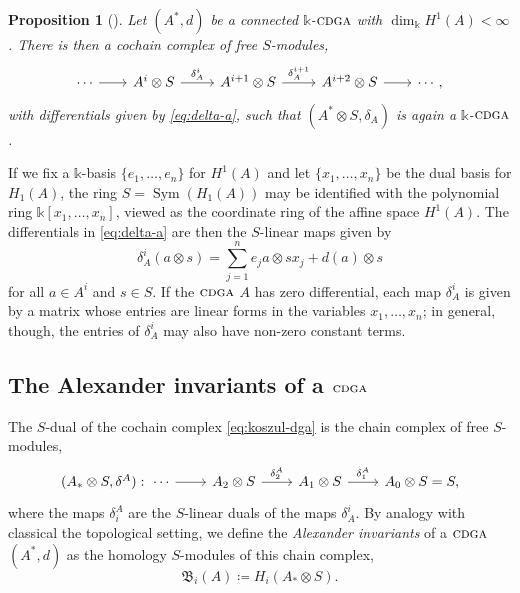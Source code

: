 \documentclass{article}
\numberwithin{equation}{section}
\newtheorem{proposition}[theorem]{Proposition}
\theoremstyle{definition}
\renewcommand{\k}{\mathbb{k}}
\newcommand{\B}{\mathfrak{B}}
\newcommand{\cdga}{\ensuremath{\textsc{cdga}}}
\DeclareMathOperator{\Sym}{Sym}
\begin{document}
\begin{proposition}[\cite{Su-cdga}]
\label{prop:LA}
Let $(A^*,d)$ be a connected $\k$-$\cdga$ with 
$\dim_\k H^1(A)<\infty$. There is then 
a cochain complex of free $S$-modules,
\begin{equation}
\label{eq:koszul-dga}
\begin{tikzcd}[column sep =20pt]
 \cdots \ar[r] 
& A^{i}\otimes S \ar[r, "\delta^{i}_A"] 
&[4pt] A^{i+1} \otimes S \ar[r, "\delta^{i+1}_A"] 
&[4pt] A^{i+2} \otimes S \ar[r] 
& \cdots ,
\end{tikzcd}
\end{equation}
with differentials given by \eqref{eq:delta-a}, such that 
$(A^*\otimes S,\delta_A)$ is again a $\k$-$\cdga$.
\end{proposition}

If we fix a $\k$-basis $\{ e_1,\dots, e_n \}$ for 
$H^1(A)$ and let $\{ x_1,\dots, x_n \}$ be the dual basis 
for $H_1(A)$, the ring $S=\Sym(H_1(A))$ may 
be identified with the polynomial ring $\k[x_1,\dots, x_n]$,
viewed as the coordinate ring of the affine space $H^1(A)$. 
The differentials in \eqref{eq:delta-a} are then the $S$-linear 
maps given by
\begin{equation}
\label{eq:diff}
\delta^{i}_A(a \otimes s)= 
\sum_{j=1}^{n} e_j a \otimes s x_j + d(a) \otimes s
\end{equation}
for all $a\in A^{i}$ and $s\in S$. 
If the $\cdga$ $A$ has zero differential, each map $\delta^{i}_{A}$ 
is given by a matrix whose entries are linear forms in the 
variables $x_1,\dots ,x_n$; in general, though, the entries of 
$\delta^i_A$ may also have non-zero constant terms.

\subsection{The Alexander invariants of a $\cdga$}
\label{subsec:alexinv}

The $S$-dual of the cochain complex \eqref{eq:koszul-dga} is 
the chain complex of free $S$-modules,
\begin{equation}
\label{eq:ls dual}
\begin{tikzcd}[column sep=22pt]
(A_*\otimes S,\delta^A): \ 
\cdots \ar[r]
& A_2 \otimes S   \ar[r, "\delta_2^A"] 
& A_1 \otimes S   \ar[r, "\delta_1^A"]
& A_0 \otimes S=S ,
\end{tikzcd}
\end{equation}
where the maps $\delta_i^A$ are the $S$-linear duals of the 
maps $\delta^i_A$. By analogy with classical the topological setting, 
we define the {\em Alexander invariants}\/ of a $\cdga$ $(A^*,d)$ as 
the homology $S$-modules of this chain complex, 
\begin{equation}
\label{eq:ai-def}
\B_i(A)\coloneqq H_i (A_*\otimes S) .
\end{equation}
\end{document}
